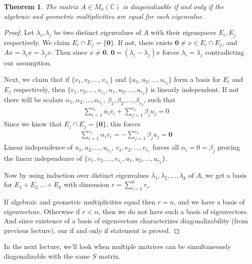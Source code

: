 \documentclass[12pt]{article}
\newtheorem{thm}{Theorem}[section]
\theoremstyle{definition}
\theoremstyle{remark}
\begin{document}
\begin{thm}
The matrix $A \in M_n(\mathbb{C})$ is diagonalizable if and only if
the algebraic and geometric multiplicities are equal for each eigenvalue.
\end{thm}
\begin{proof}
Let $\lambda_i, \lambda_j$ be two distinct eigenvalues of $A$ with their
eigenspaces $E_{i}, E_{j}$ respectively. We claim $E_i \cap E_j =
\{ \textbf{0} \}$. If not, there exists
$\textbf{0} \neq x \in E_{i} \cap E_{j}$, and $Ax = \lambda_ix = \lambda_jx$.
Then since $x \neq \textbf{0}$, $\textbf{0} = (\lambda_i - \lambda_j)
x$ forces $\lambda_i = \lambda_j$ contradicting our assumption.

Next, we claim that if $\{ v_1
, v_2 , \ldots , v_{r_1} \}$ and $\{ u_1 , u_2 , \ldots , u_{r_2} \}$
form a basis for $E_{i}$ and $E_{j}$ respectively,
then $\{ v_1 , v_2 , \ldots , v_{r_1}, u_1 , u_2 , \ldots , u_{r_2}
\}$ is linearly independent. If not there will be scalars $ \alpha_1
, \alpha_2 , \ldots , \alpha_{r_1}$, $\beta_1 , \beta_2 , \ldots ,
\beta_{r_2}$, such that
\begin{align*}
  \sum_{i = 1}^{r_1} \alpha_{i} v_i + \sum_{j = 1}^{r_2} \beta_j u_j = 0
\end{align*}
Since we know that $E_{j} \cap E_{j} = \{  \textbf{0} \}$, this forces
\begin{align*}
  \sum_{i = 1}^{r_1} \alpha_{i} v_i = - \sum_{j = 1}^{r_2} \beta_j
  u_j = \textbf{0}
\end{align*}
Linear independence of $u_1 , u_2 , \ldots , u_{r_2}$, $v_1 , v_2 ,
\ldots , v_{r_1}$ forces all $\alpha_i = 0 = \beta_j$ proving the
linear independence of $\{v_1 , v_2 , \ldots , v_{r_1}, u_1 , u_2 ,
\ldots , u_{r_2} \}$.

Now by using induction over distinct eigenvalues $\lambda_1 ,
\lambda_2 , \ldots , \lambda_k$ of $A$, we get a basis for
$E_1 + E_2 \ \ldots  + E_k$ with dimension $r = \sum_{i = 1}^{k} r_i$.

If algebraic and geometric multiplicities equal then $r = n$, and we
have a basis of eigenvectors. Otherwise if $r < n$, then we do not
have such a basis of eigenvectors. And since existence of a basis of
eigenvectors characterizes diagonalizability (from previous lecture),
our if and only if statement is proved.
\end{proof}

In the next lecture, we'll look when multiple matrices can be simultaneously
diagonalizable with the same $S$ matrix.

%
%
\end{document}
